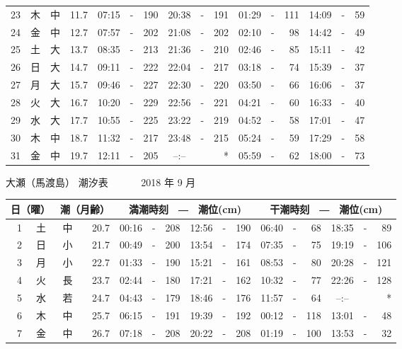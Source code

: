 \documentclass[12pt.a4j]{jsarticle}
\begin{document}
\begin{center}
\begin{table}[ht]
\begin{tabular}{|rc|cr|ccrccr|ccrccr|}
23 & 木 & 中 & 11.7 & 07:15 &-& 190 & 20:38 &-& 191 & 01:29 &-& 111 & 14:09 &-&  59 \\
24 & 金 & 中 & 12.7 & 07:57 &-& 202 & 21:08 &-& 202 & 02:10 &-&  98 & 14:42 &-&  49 \\
25 & 土 & 大 & 13.7 & 08:35 &-& 213 & 21:36 &-& 210 & 02:46 &-&  85 & 15:11 &-&  42 \\
26 & 日 & 大 & 14.7 & 09:11 &-& 222 & 22:04 &-& 217 & 03:18 &-&  74 & 15:39 &-&  37 \\
27 & 月 & 大 & 15.7 & 09:46 &-& 227 & 22:30 &-& 220 & 03:50 &-&  66 & 16:06 &-&  37 \\
28 & 火 & 大 & 16.7 & 10:20 &-& 229 & 22:56 &-& 221 & 04:21 &-&  60 & 16:33 &-&  40 \\
29 & 水 & 大 & 17.7 & 10:55 &-& 225 & 23:22 &-& 219 & 04:52 &-&  58 & 17:01 &-&  47 \\
30 & 木 & 中 & 18.7 & 11:32 &-& 217 & 23:48 &-& 215 & 05:24 &-&  59 & 17:29 &-&  58 \\
31 & 金 & 中 & 19.7 & 12:11 &-& 205 & --:-- & &  *  & 05:59 &-&  62 & 18:00 &-&  73 \\
\hline
\end{tabular}
\end{table}
\newpage
{\LARGE 大瀬（馬渡島）  潮汐表　　　}
{\large 2018 年  9 月}\\
\begin{table}[ht]
\begin{tabular}{|rc|cr|ccrccr|ccrccr|}
\hline
\multicolumn{2}{|c|}{日（曜）} & \multicolumn{2}{c|}{潮（月齢）} & \multicolumn{6}{c|}{満潮時刻　―　潮位(cm)} & \multicolumn{6}{c|}{干潮時刻　―　潮位(cm)} \\
\hline
 1 & 土 & 中 & 20.7 & 00:16 &-& 208 & 12:56 &-& 190 & 06:40 &-&  68 & 18:35 &-&  89 \\
 2 & 日 & 小 & 21.7 & 00:49 &-& 200 & 13:54 &-& 174 & 07:35 &-&  75 & 19:19 &-& 106 \\
 3 & 月 & 小 & 22.7 & 01:33 &-& 190 & 15:21 &-& 161 & 08:53 &-&  80 & 20:28 &-& 121 \\
 4 & 火 & 長 & 23.7 & 02:44 &-& 180 & 17:21 &-& 162 & 10:32 &-&  77 & 22:26 &-& 128 \\
 5 & 水 & 若 & 24.7 & 04:43 &-& 179 & 18:46 &-& 176 & 11:57 &-&  64 & --:-- & &  *  \\
 6 & 木 & 中 & 25.7 & 06:15 &-& 191 & 19:39 &-& 192 & 00:12 &-& 118 & 13:01 &-&  48 \\
 7 & 金 & 中 & 26.7 & 07:18 &-& 208 & 20:22 &-& 208 & 01:19 &-& 100 & 13:53 &-&  32 \\

\end{tabular}
\end{table}
\end{center}
\end{document}
